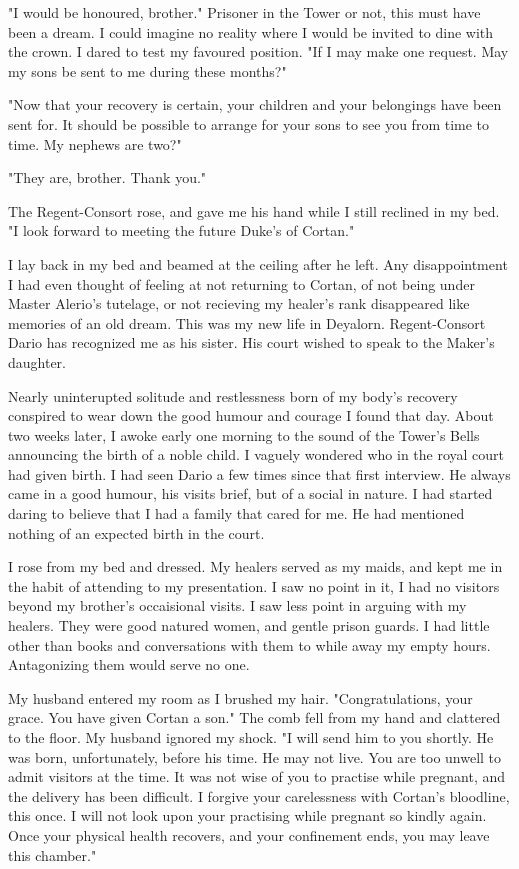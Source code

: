 \documentclass{article}
\begin{document}
"I would be honoured, brother." Prisoner in the Tower or not, this must have been a dream. I could imagine no reality where I would be invited to dine with the crown. I dared to test my favoured position. "If I may make one request. May my sons be sent to me during these months?"

"Now that your recovery is certain, your children and your belongings have been sent for. It should be possible to arrange for your sons to see you from time to time. My nephews are two?"

"They are, brother. Thank you."

The Regent-Consort rose, and gave me his hand while I still reclined in my bed. "I look forward to meeting the future Duke's of Cortan."

I lay back in my bed and beamed at the ceiling after he left. Any disappointment I had even thought of feeling at not returning to Cortan, of not being under Master Alerio's tutelage, or not recieving my healer's rank disappeared like memories of an old dream. This was my new life in Deyalorn. Regent-Consort Dario has recognized me as his sister. His court wished to speak to the Maker's daughter. 

\vspace{.5cm}

Nearly uninterupted solitude and restlessness born of my body's recovery conspired to wear down the good humour and courage I found that day. About two weeks later, I awoke early one morning to the sound of the Tower's Bells announcing the birth of a noble child. I vaguely wondered who in the royal court had given birth. I had seen Dario a few times since that first interview. He always came in a good humour, his visits brief, but of a social in nature. I had started daring to believe that I had a family that cared for me. He had mentioned nothing of an expected birth in the court.

I rose from my bed and dressed. My healers served as my maids, and kept me in the habit of attending to my presentation. I saw no point in it, I had no visitors beyond my brother's occaisional visits. I saw less point in arguing with my healers. They were good natured women, and gentle prison guards. I had little other than books and conversations with them to while away my empty hours. Antagonizing them would serve no one. 

My husband entered my room as I brushed my hair. "Congratulations, your grace. You have given Cortan a son." The comb fell from my hand and clattered to the floor. My husband ignored my shock. "I will send him to you shortly. He was born, unfortunately, before his time. He may not live. You are too unwell to admit visitors at the time. It was not wise of you to practise while pregnant, and the delivery has been difficult. I forgive your carelessness with Cortan's bloodline, this once. I will not look upon your practising while pregnant so kindly again. Once your physical health recovers, and your confinement ends, you may leave this chamber."
\end{document}
